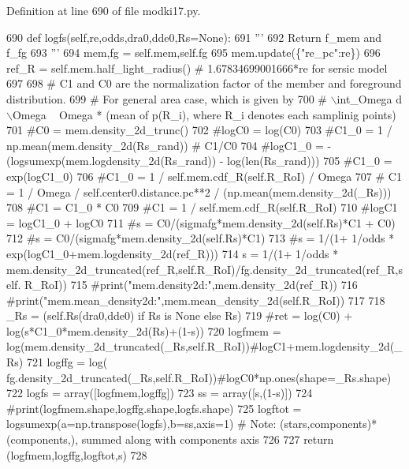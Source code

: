 Definition at line 690 of file modki17.\+py.


\begin{DoxyCode}
690     \textcolor{keyword}{def }logfs(self,re,odds,dra0,dde0,Rs=None):
691         \textcolor{stringliteral}{'''}
692 \textcolor{stringliteral}{        Return f\_mem and f\_fg}
693 \textcolor{stringliteral}{        '''}
694         mem,fg = self.mem,self.fg
695         mem.update(\{\textcolor{stringliteral}{"re\_pc"}:re\})
696         ref\_R = self.mem.half\_light\_radius() \textcolor{comment}{# 1.67834699001666*re for sersic model}
697         
698         \textcolor{comment}{# C1 and C0 are the normalization factor of the member and foreground distribution.}
699         \textcolor{comment}{# For general area case, which is given by}
700         \textcolor{comment}{# \(\backslash\)int\_Omega d\(\backslash\)Omega ~ Omega * (mean of p(R\_i), where R\_i denotes each samplinig points) }
701         \textcolor{comment}{#C0 = mem.density\_2d\_trunc()}
702         \textcolor{comment}{#logC0 = log(C0)}
703         \textcolor{comment}{#C1\_0 = 1 / np.mean(mem.density\_2d(Rs\_rand)) # C1/C0}
704         \textcolor{comment}{#logC1\_0 = -(logsumexp(mem.logdensity\_2d(Rs\_rand)) - log(len(Rs\_rand)))}
705         \textcolor{comment}{#C1\_0 = exp(logC1\_0)}
706         \textcolor{comment}{#C1\_0 = 1 / self.mem.cdf\_R(self.R\_RoI) / Omega}
707         \textcolor{comment}{# C1 = 1 / Omega / self.center0.distance.pc**2 / (np.mean(mem.density\_2d(\_Rs)))}
708         \textcolor{comment}{#C1 = C1\_0 * C0}
709         \textcolor{comment}{#C1 = 1 / self.mem.cdf\_R(self.R\_RoI)}
710         \textcolor{comment}{#logC1 = logC1\_0 + logC0}
711         \textcolor{comment}{#s = C0/(sigmafg*mem.density\_2d(self.Rs)*C1 + C0)}
712         \textcolor{comment}{#s = C0/(sigmafg*mem.density\_2d(self.Rs)*C1)}
713         \textcolor{comment}{#s = 1/(1+ 1/odds * exp(logC1\_0+mem.logdensity\_2d(ref\_R)))}
714         s = 1/(1+ 1/odds * mem.density\_2d\_truncated(ref\_R,self.R\_RoI)/fg.density\_2d\_truncated(ref\_R,self.
      R\_RoI))
715         \textcolor{comment}{#print("mem.density2d:",mem.density\_2d(ref\_R))}
716         \textcolor{comment}{#print("mem.mean\_density2d:",mem.mean\_density\_2d(self.R\_RoI))}
717         
718         \_Rs = (self.Rs(dra0,dde0) \textcolor{keywordflow}{if} Rs \textcolor{keywordflow}{is} \textcolor{keywordtype}{None} \textcolor{keywordflow}{else} Rs)
719         \textcolor{comment}{#ret = log(C0) + log(s*C1\_0*mem.density\_2d(Rs)+(1-s))}
720         logfmem = log(mem.density\_2d\_truncated(\_Rs,self.R\_RoI))\textcolor{comment}{#logC1+mem.logdensity\_2d(\_Rs)}
721         logffg  = log( fg.density\_2d\_truncated(\_Rs,self.R\_RoI))\textcolor{comment}{#logC0*np.ones(shape=\_Rs.shape)}
722         logfs = array([logfmem,logffg])
723         ss = array([s,(1-s)])
724         \textcolor{comment}{#print(logfmem.shape,logffg.shape,logfs.shape)}
725         logftot = logsumexp(a=np.transpose(logfs),b=ss,axis=1) \textcolor{comment}{# Note: (stars,components)*(components,),
       summed along with components axis }
726         
727         \textcolor{keywordflow}{return} (logfmem,logffg,logftot,s)
728     
\end{DoxyCode}
